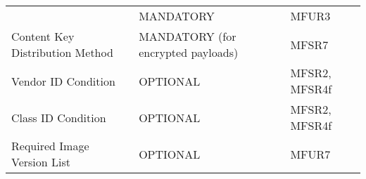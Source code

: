 \documentclass[0-thesis.tex]{subfiles}
\begin{document}
\begin{longtable}[]{@{}lll@{}}
\begin{minipage}[t]{0.32\columnwidth}
    \end{minipage} & \begin{minipage}[t]{0.36\columnwidth}\raggedright\strut
    MANDATORY\strut \end{minipage} &
    \begin{minipage}[t]{0.23\columnwidth}\raggedright\strut MFUR3\strut
    \end{minipage}\tabularnewline
    \begin{minipage}[t]{0.32\columnwidth}\raggedright\strut Content Key Distribution
    Method\strut \end{minipage} & \begin{minipage}[t]{0.36\columnwidth}\raggedright\strut
    MANDATORY (for encrypted payloads)\strut \end{minipage} &
    \begin{minipage}[t]{0.23\columnwidth}\raggedright\strut MFSR7\strut
    \end{minipage}\tabularnewline
    \begin{minipage}[t]{0.32\columnwidth}\raggedright\strut Vendor ID Condition\strut
    \end{minipage} & \begin{minipage}[t]{0.36\columnwidth}\raggedright\strut
    OPTIONAL\strut \end{minipage} &
    \begin{minipage}[t]{0.23\columnwidth}\raggedright\strut MFSR2, MFSR4f\strut
    \end{minipage}\tabularnewline
    \begin{minipage}[t]{0.32\columnwidth}\raggedright\strut Class ID Condition\strut
    \end{minipage} & \begin{minipage}[t]{0.36\columnwidth}\raggedright\strut
    OPTIONAL\strut \end{minipage} &
    \begin{minipage}[t]{0.23\columnwidth}\raggedright\strut MFSR2, MFSR4f\strut
    \end{minipage}\tabularnewline
    \begin{minipage}[t]{0.32\columnwidth}\raggedright\strut Required Image Version
    List\strut \end{minipage} & \begin{minipage}[t]{0.36\columnwidth}\raggedright\strut
    OPTIONAL\strut \end{minipage} &
    \begin{minipage}[t]{0.23\columnwidth}\raggedright\strut MFUR7\strut
    \end{minipage}\tabularnewline

\end{longtable}
\end{document}
